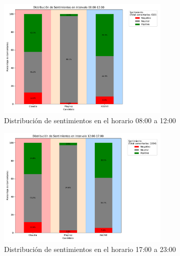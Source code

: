\documentclass[10pt, a4paper]{article}
\begin{document}
	
	\begin{figure}[h!] %
		\centering
		\includegraphics[width=0.73\textwidth]{sA_intervalo_0812.pdf} %
		\caption{Distribución de sentimientos en el horario 08:00 a 12:00} %
		\label{fig:sA_08a12} %
	\end{figure}
	
	\begin{figure}[h!] %
		\centering
		\includegraphics[width=0.73\textwidth]{sA_intervalo_1217.pdf} %
		\caption{Distribución de sentimientos en el horario 17:00 a 23:00} %
		\label{fig:sA_12a17} %
	\end{figure}
	
\end{document}
